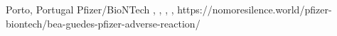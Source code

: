           {Porto, Portugal}
          {}
          {Pfizer/BioNTech}
          {}
          {
            ,
            ,
            ,
            ,
          }
          {https://nomoresilence.world/pfizer-biontech/bea-guedes-pfizer-adverse-reaction/}

